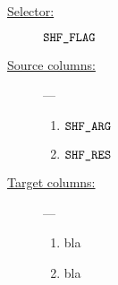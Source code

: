 \begin{description}
	\item[\underline{Selector:}] $\texttt{SHF\_FLAG}$
	\item[\underline{Source columns:}] ---
		\begin{multicols}{2}
			\begin{enumerate}
				\item $\texttt{SHF\_ARG}$
				\item $\texttt{SHF\_RES}$
			\end{enumerate}
		\end{multicols}
	\item[\underline{Target columns:}] ---
		\begin{multicols}{2}
		\begin{enumerate}
			\item bla
			\item bla
		\end{enumerate}
		\end{multicols}
\end{description}
